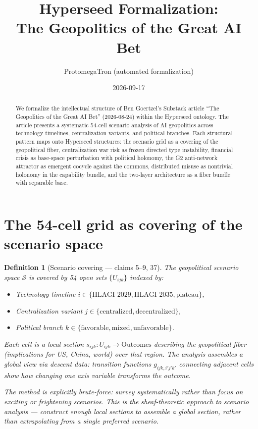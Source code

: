 \documentclass[11pt,a4paper]{article}
\title{Hyperseed Formalization:\\
  The Geopolitics of the Great AI Bet}
\author{ProtomegaTron (automated formalization)}
\date{2026-09-17}
\newtheorem{definition}{Definition}[section]
\begin{document}
\maketitle

\begin{abstract}
We formalize the intellectual structure of Ben Goertzel's Substack article
``The Geopolitics of the Great AI Bet'' (2026-08-24) within the Hyperseed
ontology. The article presents a systematic 54-cell scenario analysis of
AI geopolitics across technology timelines, centralization variants, and
political branches. Each structural pattern maps onto Hyperseed structures:
the scenario grid as a covering of the geopolitical fiber, centralization
war risk as frozen directed type instability, financial crisis as base-space
perturbation with political holonomy, the G2 anti-network attractor as
emergent cocycle against the commons, distributed misuse as nontrivial
holonomy in the capability bundle, and the two-layer architecture as a
fiber bundle with separable base.
\end{abstract}

\tableofcontents

\section{The 54-cell grid as covering of the scenario space}
\label{sec:grid}

\begin{definition}[Scenario covering --- claims 5--9, 37]
\label{def:covering}
The geopolitical scenario space $\mathcal{S}$ is covered by 54 open sets
$\{U_{ijk}\}$ indexed by:
\begin{itemize}
\item Technology timeline $i \in \{\text{HLAGI-2029}, \text{HLAGI-2035},
  \text{plateau}\}$,
\item Centralization variant $j \in \{\text{centralized}, \text{decentralized}\}$,
\item Political branch $k \in \{\text{favorable}, \text{mixed},
  \text{unfavorable}\}$.
\end{itemize}
Each cell is a local section $s_{ijk} : U_{ijk} \to \text{Outcomes}$
describing the geopolitical fiber (implications for US, China, world)
over that region. The analysis assembles a global view via descent data:
transition functions $g_{ijk, i'j'k'}$ connecting adjacent cells show
how changing one axis variable transforms the outcome.

The method is explicitly brute-force: survey systematically rather than
focus on exciting or frightening scenarios. This is the sheaf-theoretic
approach to scenario analysis --- construct enough local sections to
assemble a global section, rather than extrapolating from a single
preferred scenario.
\end{definition}
\end{document}
